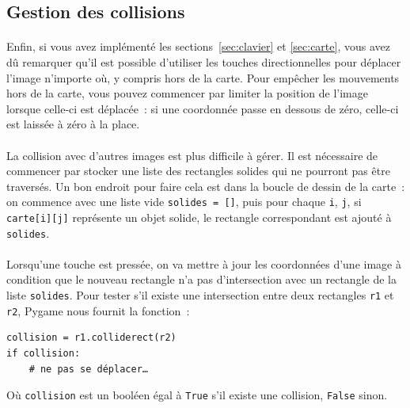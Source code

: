 \subsection{Gestion des collisions}
\label{sec:collisions}

\paragraph{}
Enfin, si vous avez implémenté les sections~\ref{sec:clavier} et \ref{sec:carte}, vous avez dû remarquer qu'il est possible d'utiliser les touches directionnelles pour déplacer l'image n'importe où, y compris hors de la carte.
Pour empêcher les mouvements hors de la carte, vous pouvez commencer par limiter la position de l'image lorsque celle-ci est déplacée~: si une coordonnée passe en dessous de zéro, celle-ci est laissée à zéro à la place.

\paragraph{}
La collision avec d'autres images est plus difficile à gérer.
Il est nécessaire de commencer par stocker une liste des rectangles solides qui ne pourront pas être traversés.
Un bon endroit pour faire cela est dans la boucle de dessin de la carte~: on commence avec une liste vide \texttt{solides = []}, puis pour chaque \texttt{i}, \texttt{j}, si \texttt{carte[i][j]} représente un objet solide, le rectangle correspondant est ajouté à \texttt{solides}.

\paragraph{}
Lorsqu'une touche est pressée, on va mettre à jour les coordonnées d'une image à condition que le nouveau rectangle n'a pas d'intersection avec un rectangle de la liste \texttt{solides}.
Pour tester s'il existe une intersection entre deux rectangles \texttt{r1} et \texttt{r2}, Pygame nous fournit la fonction~:
\begin{verbatim}
collision = r1.colliderect(r2)
if collision:
    # ne pas se déplacer…
\end{verbatim}
Où \texttt{collision} est un booléen égal à \texttt{True} s'il existe une collision, \texttt{False} sinon.

